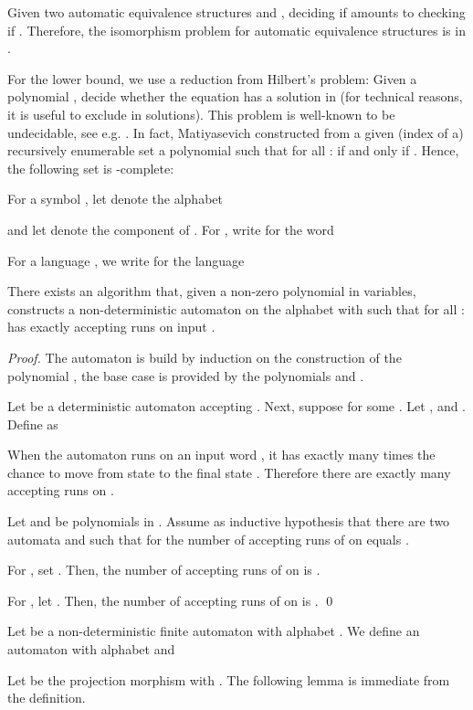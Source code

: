 \documentclass[envcountsame]{llncs}
\begin{document}
Given two automatic equivalence structures  and
, deciding if  amounts to checking if
. Therefore, the isomorphism problem for automatic
equivalence structures is in .

For the  lower bound, we use a reduction from
Hilbert's  problem: Given a polynomial
, decide whether the equation
 has a solution in  (for technical reasons,
it is useful to exclude  in solutions).
This problem is well-known to be
undecidable, see e.g. \cite{Mat93}. In fact, Matiyasevich constructed
from a given (index of a) recursively enumerable set
 a polynomial 
such that for all :
 if and only if .
Hence, the following set is -complete:

For a symbol , let  denote the alphabet

and let  denote the  component of .
For , write
 for the word

For a language , we write  for the language


\begin{lemma}\label{lm:equiv-runs}
  There exists an algorithm that, given a non-zero polynomial
   in  variables, constructs a
  non-deterministic automaton  on the alphabet
   with  such that
  for all :  has exactly
   accepting runs on input .
\end{lemma}

\begin{proof}
  The automaton  is build by induction on the
  construction of the polynomial , the base case is provided by the
  polynomials  and .

  Let  be a deterministic automaton accepting .
  Next, suppose  for some . Let
  ,  and . Define  as
  
  When the automaton  runs on an
  input word , it has exactly  many times the
  chance to move from state  to the final state .  Therefore
  there are exactly  many accepting runs on
  .

  Let  and  be polynomials in
  . Assume as inductive hypothesis that there are
  two automata  and
   such that for  the number of accepting runs of  on
   equals .

  For , set
  .  Then, the number of accepting runs of
   on  is .

  For , let
  .  Then, the number of accepting runs of
   on  is .  \qed
\end{proof}

\noindent
Let  be a non-deterministic finite automaton with
alphabet . We define an automaton 
with alphabet  and

Let  be the projection morphism with
.
The following lemma is immediate from the definition.
\end{document}
